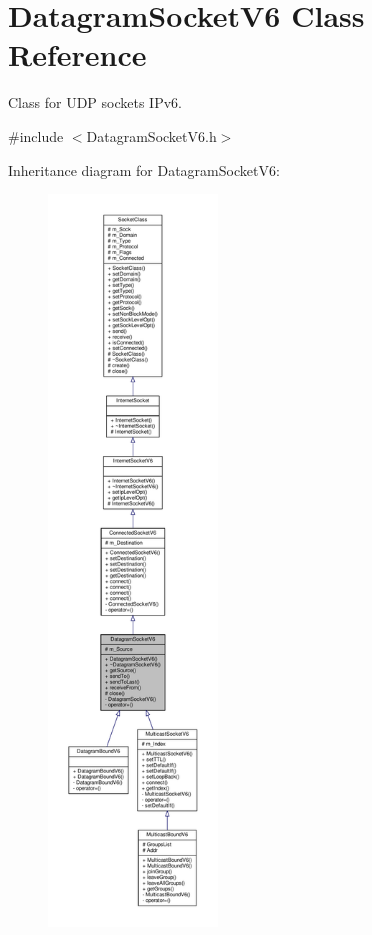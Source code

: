 \hypertarget{classDatagramSocketV6}{}\section{Datagram\+Socket\+V6 Class Reference}
\label{classDatagramSocketV6}


Class for U\+DP sockets I\+Pv6.  




{\ttfamily \#include $<$Datagram\+Socket\+V6.\+h$>$}



Inheritance diagram for Datagram\+Socket\+V6\+:\nopagebreak
\begin{figure}[H]
\begin{center}
\leavevmode
\includegraphics[height=550pt]{classDatagramSocketV6__inherit__graph}
\end{center}
\end{figure}

